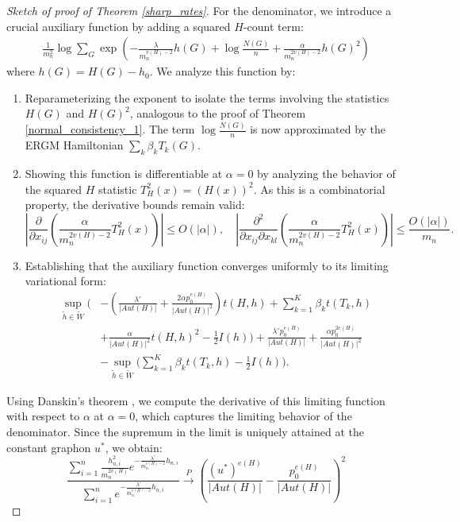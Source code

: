 \documentclass[12pt]{article}
\numberwithin{equation}{section}
\begin{document}
\begin{proof}[Sketch of proof of Theorem \ref{sharp_rates}]
For the denominator, we introduce a crucial auxiliary function by adding a squared $H$-count term:
\begin{align*}
\frac{1}{m_n^2} \log \sum_{G} \exp\left(-\frac{\lambda}{m_n^{v(H)-2}} h(G) + \log \frac{N(G)}{n} + \frac{\alpha}{m_n^{2v(H)-2}} h(G)^2\right)
\end{align*}
where $h(G) = H(G) - h_0$. We analyze this function by:
\begin{enumerate}
    \item Reparameterizing the exponent to isolate the terms involving the statistics $H(G)$ and $H(G)^2$, analogous to the proof of Theorem \ref{normal_consistency_1}. The term $\log \frac{N(G)}{n}$ is now approximated by the ERGM Hamiltonian $\sum_k \beta_k T_k(G)$.

    \item Showing this function is differentiable at $\alpha=0$ by analyzing the behavior of the squared $H$ statistic $T_H^2(x) = (H(x))^2$. As this is a combinatorial property, the derivative bounds remain valid:
    \[
    \left|\frac{\partial}{\partial x_{ij}}\left(\frac{\alpha}{m_n^{2v(H)-2}}T_H^2(x)\right)\right|\le O(|\alpha|), \quad
    \left|\frac{\partial^2}{\partial x_{ij}\partial x_{kl}}\left(\frac{\alpha}{m_n^{2v(H)-2}}T_H^2(x)\right)\right|\le \frac{O(|\alpha|)}{m_n}.
    \]
    
    \item Establishing that the auxiliary function converges uniformly to its limiting variational form:
    \begin{align*}
     \sup_{\tilde{h}\in\tilde{W}}\bigg(&-\left(\frac{\lambda^{\circ}}{|Aut(H)|}+\frac{2\alpha p_0^{e(H)}}{|Aut(H)|^2}\right) t(H,h) + \sum_{k=1}^K \beta_k t(T_k, h) \\
     &+ \frac{\alpha}{|Aut(H)|^2} t(H,h)^2 - \frac{1}{2} I(h)\bigg) + \frac{\lambda^{\circ} p_0^{e(H)}}{\lvert Aut(H)\rvert} + \frac{\alpha p_0^{2e(H)}}{\lvert Aut(H)\rvert^2} \\&- \sup_{\tilde{h}\in\tilde{W}}\bigg( \sum_{k=1}^K \beta_k t(T_k, h) 
      - \frac{1}{2} I(h)\bigg).
    \end{align*}
\end{enumerate}

Using Danskin's theorem \cite{danskin1966theory}, we compute the derivative of this limiting function with respect to $\alpha$ at $\alpha=0$, which captures the limiting behavior of the denominator. Since the supremum in the limit is uniquely attained at the constant graphon $u^*$, we obtain:
\begin{equation}
\frac{\sum\limits_{i=1}^{n}\frac{h_{n,i}^2}{m_n^{2v(H)}} e^{-\frac{\lambda^{\circ}}{m_n^{v(H)-2}} h_{n,i}}}{\sum\limits_{i=1}^{n} e^{-\frac{\lambda^{\circ}}{m_n^{v(H)-2}} h_{n,i}}}\xrightarrow{P} \left(\frac{(u^*)^{e(H)}}{|Aut(H)|} - \frac{p_0^{e(H)}}{|Aut(H)|}\right)^2
\label{denom_conv}\end{equation}


\end{proof}
\end{document}
